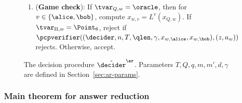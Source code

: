 \begin{figure}[!htb]
\begin{gamespec}
{\begin{enumerate}
    \item (\textbf{Game check}): If $\tvar_{Q,w} = \oracle$, then for $v \in
      \{\alice,\bob\}$, compute $x_{w,v} = L^{v}(x_{Q,w})$.
      If $\tvar_{\Pi,w} = \Point_6$, reject if $\pcpverifier((\decider, n , T,
      \qlen, \gamma, x_{w,\alice}, x_{w,\bob}), (z, a_{w} ))$ rejects.
      Otherwise, accept. 
      \label{enu:ar-game}
    \end{enumerate}
  }
  \end{gamespec}
  
  \caption{The decision procedure $\tdans$.
    Parameters $T,Q,q,m,m',d,\gamma$ are defined in
    Section~\ref{sec:ar-params}.}
  \label{fig:decider-pcp}
  
\end{figure}

\subsubsection{Main theorem for answer reduction}

